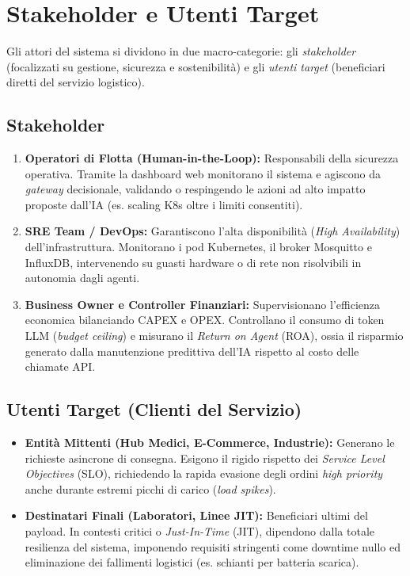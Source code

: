 \section{Stakeholder e Utenti Target}
\label{sec:stakeholder_utenti}

Gli attori del sistema si dividono in due macro-categorie: gli \textit{stakeholder} (focalizzati su gestione, sicurezza e sostenibilità) e gli \textit{utenti target} (beneficiari diretti del servizio logistico).

\subsection*{Stakeholder}

\begin{enumerate}
    \item \textbf{Operatori di Flotta (Human-in-the-Loop):} 
    Responsabili della sicurezza operativa. Tramite la dashboard web monitorano il sistema e agiscono da \textit{gateway} decisionale, validando o respingendo le azioni ad alto impatto proposte dall'IA (es. scaling K8s oltre i limiti consentiti).

    \item \textbf{SRE Team / DevOps:}
    Garantiscono l'alta disponibilità (\textit{High Availability}) dell'infrastruttura. Monitorano i pod Kubernetes, il broker Mosquitto e InfluxDB, intervenendo su guasti hardware o di rete non risolvibili in autonomia dagli agenti.

    \item \textbf{Business Owner e Controller Finanziari:}
    Supervisionano l'efficienza economica bilanciando CAPEX e OPEX. Controllano il consumo di token LLM (\textit{budget ceiling}) e misurano il \textit{Return on Agent} (ROA), ossia il risparmio generato dalla manutenzione predittiva dell'IA rispetto al costo delle chiamate API.
\end{enumerate}

\subsection*{Utenti Target (Clienti del Servizio)}

\begin{itemize}
    \item \textbf{Entità Mittenti (Hub Medici, E-Commerce, Industrie):}
    Generano le richieste asincrone di consegna. Esigono il rigido rispetto dei \textit{Service Level Objectives} (SLO), richiedendo la rapida evasione degli ordini \textit{high priority} anche durante estremi picchi di carico (\textit{load spikes}).

    \item \textbf{Destinatari Finali (Laboratori, Linee JIT):}
    Beneficiari ultimi del payload. In contesti critici o \textit{Just-In-Time} (JIT), dipendono dalla totale resilienza del sistema, imponendo requisiti stringenti come downtime nullo ed eliminazione dei fallimenti logistici (es. schianti per batteria scarica).
\end{itemize}

